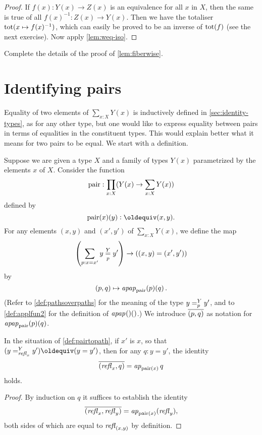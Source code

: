 \begin{proof}
If $f(x): Y(x) \to Z(x)$ is an equivalence for all $x$ in $X$,
then the same is true of all $f(x)^{-1}: Z(x) \to Y(x)$.
Then we have the totaliser $\mathop{\mathrm{tot}}(x\mapsto f(x)^{-1})$,
which can easily be proved to be an inverse of $\mathop{\mathrm{tot}}(f)$
(see the next exercise). Now apply \cref{lem:weq-iso}.
\end{proof}

\begin{xca}\label{xca:fiberwise}
Complete the details of the proof of \cref{lem:fiberwise}.
\end{xca}

\section{Identifying pairs}\label{sec:pairpaths}

Equality of two elements of $\sum _{x:X} Y(x)$ is inductively defined in \cref{sec:identity-types}, as for any other type, but
one would like to express equality between pairs in terms of equalities in the constituent types.  This would explain better what it means for
two pairs to be equal.  We start with a definition.

\begin{definition}\label{def:pairtopath}
  Suppose we are given a type $X$ and a family of types $Y(x)$ parametrized by the elements $x$ of $X$.
  Consider the function $$\mathop{\mathrm{pair}} : \prod_{x:X} ( Y(x) \to \sum _{x:X} Y(x) ) $$ defined by $$ \pair(x)(y) \defeq (x,y). $$
  For any elements $(x,y)$ and $(x',y')$ of $\sum _{x:X} Y(x)$, we define the map 
  $$\left( \sum_{p:x=x'} {y} \overset{Y}{\underset{p}=} y' \right) \to \left ( (x,y) = (x',y') \right )$$
  by $$ (p,q) \mapsto \mathop{{\it apap}_{\mathop{\mathrm{pair}}}(p)(q)}. $$
  (Refer to \cref{def:pathsoverpaths} for the meaning of the type $y =^{Y}_{p} y'$, and to \cref{def:applfun2} for the definition of $\mathop{{\it apap}_{}()()}$.)
  We introduce $\overline{({p},{q})}$ as notation for $\mathop{{\it apap}_{\mathop{\mathrm{pair}}}(p)(q)}$.
\end{definition}

\begin{lemma}\label{coro:isEq-pair=}
  In the situation of \cref{def:pairtopath}, if $x'$ is $x$, so that $( \pathover y Y {\refl x} {y'} ) \jdeq ( y = y' )$,
  then for any $q : y = y'$, the identity $$\overline{({\mathop{{\it refl}_{x}}},{q})} = \mathop{{\it ap}_{\mathop{\mathrm{pair}} (x)}} q$$ holds.
\end{lemma}

\begin{proof}
  By induction on $q$ it suffices to establish the identity $$\overline{({\mathop{{\it refl}_{x}}},{\mathop{{\it refl}_{y}}})} = \mathop{{\it ap}_{\mathop{\mathrm{pair}} (x)}} (\mathop{{\it refl}_{y}}),$$ both sides of which are
  equal to $\mathop{{\it refl}_{(x,y)}}$ by definition.
\end{proof}

